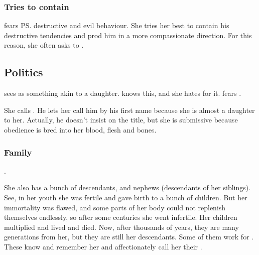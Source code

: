 \subsubsection{Tries to contain \Ishnaruchaefir}
\Criseis{} fears \ps{\Ishnaruchaefir} destructive and evil behaviour. 
She tries her best to contain his destructive tendencies and prod him in a more compassionate direction. 
For this reason, she often asks to . 










\subsection{Politics}
\Ishnaruchaefir{} sees \Criseis{} as something akin to a daughter. 
\Nzessuacrith{} knows this, and she hates \Criseis{} for it. 
\Criseis{} fears \Nzessuacrith. 

She calls \Ishnaruchaefir{} . 
He lets her call him by his first name because she is almost a daughter to her. 
Actually, he doesn't insist on the title, but she is submissive because obedience is bred into her \scathaese{} blood, flesh and bones. 





\subsubsection{Family}
\Criseis{} . 

She also has a bunch of descendants, and nephews (descendants of her siblings). 
See, in her youth she was fertile and gave birth to a bunch of children. 
But her immortality was flawed, and some parts of her body could not replenish themselves endlessly, so after some centuries she went infertile. 
Her children multiplied and lived and died. 
Now, after thousands of years, they are many generations from her, but they are still her descendants. 
Some of them work for \Ishnaruchaefir{}. 
These know and remember her and affectionately call her their . 









